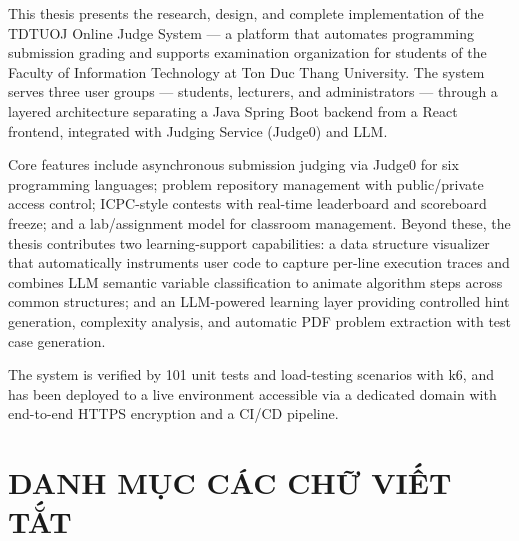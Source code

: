 \documentclass[12pt, a4paper]{report}
\begin{document}
\noindent This thesis presents the research, design, and complete implementation of the
TDTUOJ Online Judge System — a platform that automates programming submission grading and
supports examination organization for students of the Faculty of Information Technology at
Ton Duc Thang University. The system serves three user groups — students, lecturers, and
administrators — through a layered architecture separating a Java Spring Boot backend from
a React frontend, integrated with Judging Service (Judge0) and \ac{LLM}.

\noindent Core features include asynchronous submission judging via Judge0 for six
programming languages; problem repository management with public/private access control;
\ac{ICPC}-style contests with real-time leaderboard and scoreboard freeze; and a
lab/assignment model for classroom management. Beyond these, the thesis contributes two
learning-support capabilities: a data structure visualizer that automatically instruments
user code to capture per-line execution traces and combines \ac{LLM} semantic variable
classification to animate algorithm steps across common structures; and an \ac{LLM}-powered
learning layer providing controlled hint generation, complexity analysis, and automatic
\ac{PDF} problem extraction with test case generation.

\noindent The system is verified by 101 unit tests and load-testing scenarios with k6, and
has been deployed to a live environment accessible via a dedicated domain with end-to-end
\ac{HTTPS} encryption and a \ac{CI/CD} pipeline.

\newpage

\setcounter{page}{1}

\tableofcontents
\newpage

\listoffigures
{}
\newpage

\listoftables
{}
\newpage

\chapter*{DANH MỤC CÁC CHỮ VIẾT TẮT}
\end{document}
